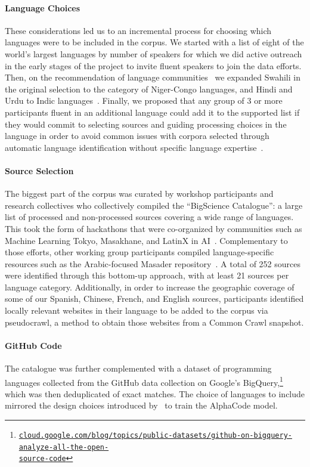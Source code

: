 \documentclass[twoside,11pt]{article}
\begin{document}
\paragraph{Language Choices} These considerations led us to an incremental process for choosing which languages were to be included in the corpus. We started with a list of eight of the world's largest languages by number of speakers for which we did active outreach in the early stages of the project to invite fluent speakers to join the data efforts. Then, on the recommendation of language communities~\citep{nekoto2020participatory} we expanded Swahili in the original selection to the category of Niger-Congo languages, and Hindi and Urdu to Indic languages~\citep{kunchukuttan2020indic}. Finally, we proposed that any group of 3 or more participants fluent in an additional language could add it to the supported list if they would commit to selecting sources and guiding processing choices in the language in order to avoid common issues with corpora selected through automatic language identification without specific language expertise~\citep{caswell2022quality}.

\paragraph{Source Selection} The biggest part of the corpus was curated by workshop participants and research collectives who collectively compiled the ``BigScience Catalogue'': a large list of processed and non-processed sources covering a wide range of languages. This took the form of hackathons that were co-organized by communities such as Machine Learning Tokyo, Masakhane, and LatinX in AI~\citep{mcmillan-major2022documenting}. Complementary to those efforts, other working group participants compiled language-specific resources such as the Arabic-focused Masader repository~\citep{alyafeai2021masader,alyafeai2022masader}. A total of 252 sources were identified through this bottom-up approach, with at least 21 sources per language category. Additionally, in order to increase the geographic coverage of some of our Spanish, Chinese, French, and English sources, participants identified locally relevant websites in their language to be added to the corpus via pseudocrawl, a method to obtain those websites from a Common Crawl snapshot.


\paragraph{GitHub Code} The catalogue was further complemented with a dataset of programming languages collected from the GitHub data collection on Google's BigQuery,\footnote{\href{https://cloud.google.com/blog/topics/public-datasets/github-on-bigquery-analyze-all-the-open-source-code}{{\texttt{cloud.google.com/blog/topics/public-datasets/github-on-bigquery-analyze-all-the-open-\\source-code}}}} which was then deduplicated of exact matches. The choice of languages to include mirrored the design choices introduced by~\citet{alphacode} to train the AlphaCode model.
\end{document}
